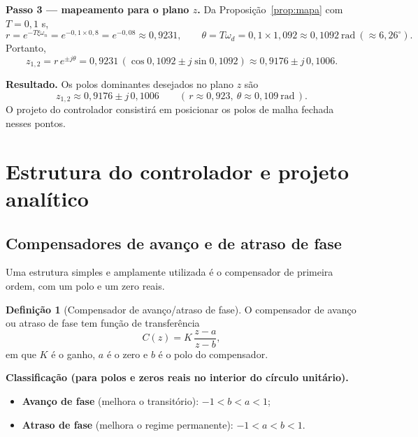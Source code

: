 \documentclass[11pt,a4paper,oneside]{book}
\theoremstyle{definition}
\newtheorem{definicao}{Definição}[chapter]
\theoremstyle{plain}
\newcommand{\wn}{\omega_n}
\newcommand{\wda}{\omega_d}
\begin{document}
\noindent\textbf{Passo 3 --- mapeamento para o plano $z$.}
Da Proposição~\ref{prop:mapa} com $T=0{,}1$ s,
\[
r=e^{-T\xi\wn}=e^{-0{,}1\times 0{,}8}=e^{-0{,}08}\approx 0{,}9231,
\qquad
\theta=T\wda=0{,}1\times 1{,}092\approx 0{,}1092\ \text{rad}\ (\approx 6{,}26^\circ).
\]
Portanto,
\[
z_{1,2}=r\,e^{\pm j\theta}
       =0{,}9231\,(\cos 0{,}1092\pm j\sin 0{,}1092)
       \approx 0{,}9176\pm j\,0{,}1006.
\]

\begin{destaque}
\textbf{Resultado.} Os polos dominantes desejados no plano $z$ são
\[
z_{1,2}\approx 0{,}9176\pm j\,0{,}1006
\qquad(\,r\approx 0{,}923,\ \theta\approx 0{,}109\ \text{rad}\,).
\]
O projeto do controlador consistirá em posicionar os polos de malha fechada
nesses pontos.
\end{destaque}

\section{Estrutura do controlador e projeto analítico}
\label{sec:controlador}

\subsection{Compensadores de avanço e de atraso de fase}

Uma estrutura simples e amplamente utilizada é o compensador de primeira ordem,
com um polo e um zero reais.

\begin{definicao}[Compensador de avanço/atraso de fase]
\label{def:comp}
O compensador de avanço ou atraso de fase tem função de transferência
\begin{equation}
    C(z)=K\,\frac{z-a}{z-b},
    \label{eq:Cz}
\end{equation}
em que $K$ é o ganho, $a$ é o zero e $b$ é o polo do compensador.
\end{definicao}

\begin{destaque}
\textbf{Classificação (para polos e zeros reais no interior do círculo
unitário).}
\begin{itemize}[nosep]
    \item \textbf{Avanço de fase} (melhora o transitório):
    $-1<b<a<1$;
    \item \textbf{Atraso de fase} (melhora o regime permanente):
    $-1<a<b<1$.
\end{itemize}
\end{destaque}
\end{document}
